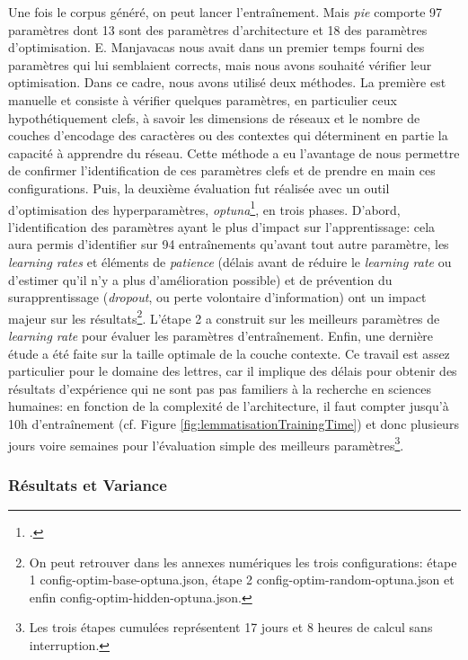 Une fois le corpus généré, on peut lancer l'entraînement. Mais \textit{pie} comporte 97 paramètres dont 13 sont des paramètres d'architecture et 18 des paramètres d'optimisation. E. Manjavacas nous avait dans un premier temps fourni des paramètres qui lui semblaient corrects, mais nous avons souhaité vérifier leur optimisation. Dans ce cadre, nous avons utilisé deux méthodes. La première est manuelle et consiste à vérifier quelques paramètres, en particulier ceux hypothétiquement clefs, à savoir les dimensions de réseaux et le nombre de couches d'encodage des caractères ou des contextes qui déterminent en partie la capacité à apprendre du réseau. Cette méthode a eu l'avantage de nous permettre de confirmer l'identification de ces paramètres clefs et de prendre en main ces configurations. Puis, la deuxième évaluation fut réalisée avec un outil d'optimisation des hyperparamètres, \textit{optuna}\footcite{optuna_2019}, en trois phases. D'abord, l'identification des paramètres ayant le plus d'impact sur l'apprentissage: cela aura permis d'identifier sur 94 entraînements qu'avant tout autre paramètre, les \textit{learning rates} et éléments de \textit{patience} (délais avant de réduire le \textit{learning rate} ou d'estimer qu'il n'y a plus d'amélioration possible) et de prévention du surapprentissage (\textit{dropout}, ou perte volontaire d'information) ont un impact majeur sur les résultats\footnote{On peut retrouver dans les annexes numériques les trois configurations: étape 1 config-optim-base-optuna.json, étape 2 config-optim-random-optuna.json et enfin config-optim-hidden-optuna.json.}. L'étape 2 a construit sur les meilleurs paramètres de \textit{learning rate} pour évaluer les paramètres d'entraînement. Enfin, une dernière étude a été faite sur la taille optimale de la couche contexte. Ce travail est assez particulier pour le domaine des lettres, car il implique des délais pour obtenir des résultats d'expérience qui ne sont pas pas familiers à la recherche en sciences humaines: en fonction de la complexité de l'architecture, il faut compter jusqu'à 10h d'entraînement (cf. Figure \ref{fig:lemmatisationTrainingTime}) et donc plusieurs jours voire semaines pour l'évaluation simple des meilleurs paramètres\footnote{Les trois étapes cumulées représentent 17 jours et 8 heures de calcul sans interruption.}.


\subsubsection{Résultats et Variance}

